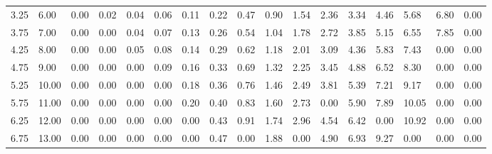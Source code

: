 \documentclass[a4paper]{article}%
\begin{document}
\begin{footnotesize}
\begin{tabular}{l|llllllllllllllll}
 3.25 & \color{red}6.00 & \color{white}0.00 & \color{green}0.02 & \color{green}0.04 & \color{green}0.06 & \color{green}0.11 & \color{green}0.22 & \color{green}0.47 & \color{green}0.90 & \color{yellow}1.54 & \color{yellow}2.36 & \color{yellow}3.34 & \color{yellow}4.46 & \color{red}5.68 & \color{red}6.80 & \color{white}0.00 \\
 3.75 & \color{red}7.00 & \color{white}0.00 & \color{white}0.00 & \color{green}0.04 & \color{green}0.07 & \color{green}0.13 & \color{green}0.26 & \color{green}0.54 & \color{yellow}1.04 & \color{yellow}1.78 & \color{yellow}2.72 & \color{yellow}3.85 & \color{red}5.15 & \color{red}6.55 & \color{red}7.85 & \color{white}0.00 \\
 4.25 & \color{red}8.00 & \color{white}0.00 & \color{white}0.00 & \color{green}0.05 & \color{green}0.08 & \color{green}0.14 & \color{green}0.29 & \color{green}0.62 & \color{yellow}1.18 & \color{yellow}2.01 & \color{yellow}3.09 & \color{yellow}4.36 & \color{red}5.83 & \color{red}7.43 & \color{white}0.00 & \color{white}0.00 \\
 4.75 & \color{red}9.00 & \color{white}0.00 & \color{white}0.00 & \color{white}0.00 & \color{green}0.09 & \color{green}0.16 & \color{green}0.33 & \color{green}0.69 & \color{yellow}1.32 & \color{yellow}2.25 & \color{yellow}3.45 & \color{red}4.88 & \color{red}6.52 & \color{red}8.30 & \color{white}0.00 & \color{white}0.00 \\
 5.25 & \color{red}10.00 & \color{white}0.00 & \color{white}0.00 & \color{white}0.00 & \color{white}0.00 & \color{green}0.18 & \color{green}0.36 & \color{green}0.76 & \color{yellow}1.46 & \color{yellow}2.49 & \color{yellow}3.81 & \color{red}5.39 & \color{red}7.21 & \color{red}9.17 & \color{white}0.00 & \color{white}0.00 \\
 5.75 & \color{red}11.00 & \color{white}0.00 & \color{white}0.00 & \color{white}0.00 & \color{white}0.00 & \color{green}0.20 & \color{green}0.40 & \color{green}0.83 & \color{yellow}1.60 & \color{yellow}2.73 & \color{white}0.00 & \color{red}5.90 & \color{red}7.89 & \color{red}10.05 & \color{white}0.00 & \color{white}0.00 \\
 6.25 & \color{red}12.00 & \color{white}0.00 & \color{white}0.00 & \color{white}0.00 & \color{white}0.00 & \color{white}0.00 & \color{green}0.43 & \color{green}0.91 & \color{yellow}1.74 & \color{yellow}2.96 & \color{red}4.54 & \color{red}6.42 & \color{white}0.00 & \color{red}10.92 & \color{white}0.00 & \color{white}0.00 \\
 6.75 & \color{red}13.00 & \color{white}0.00 & \color{white}0.00 & \color{white}0.00 & \color{white}0.00 & \color{white}0.00 & \color{green}0.47 & \color{white}0.00 & \color{yellow}1.88 & \color{white}0.00 & \color{red}4.90 & \color{red}6.93 & \color{red}9.27 & \color{white}0.00 & \color{white}0.00 & \color{white}0.00 \\

\end{tabular}
\end{footnotesize}
\end{document}
